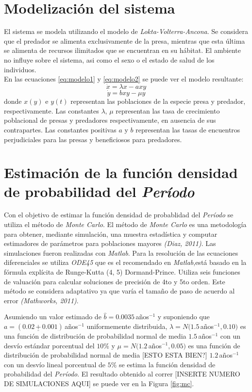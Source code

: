 \documentclass{SPANISH_acm_proc_article-sp}
\begin{document}
\section{Modelizaci\'on del sistema}
\label{sec:modelo}
El sistema se modela utilizando el modelo de \textit{Lokta-Volterra-Ancona}. Se considera que el predador
se alimenta exclusivamente de la presa, mientras que esta \'ultima se alimenta de recursos ilimitados
que se encuentran en su h\'abitat. El ambiente no influye sobre el sistema, asi como el sexo o
el estado de salud de los individuos.\\
En las ecuaciones \ref{eq:modelo1} y \ref{eq:modelo2} se puede ver el modelo resultante:
\begin{equation}
\label{eq:modelo1}
\dot{x} = \lambda x - axy
\end{equation}
\begin{equation}
\label{eq:modelo2}
\dot{y} = bxy - \mu y
\end{equation}
donde $x(y)$ e $y(t)$ representan las poblaciones de la especie presa y predador, 
respectivamente. Las constantes $\lambda$, $\mu$ representan las tasa de crecimiento
poblacional de presas y predadores respectivamente, en ausencia de sus contrapartes.
Las constantes positivas $a$ y $b$ representan las tasas de encuentros perjudiciales para 
las presas y beneficiosos para predadores.\\


\section{Estimaci\'on de la funci\'on densidad de probabilidad del \emph{Per\'iodo}}
\label{sec:estimacion}
Con el objetivo de estimar la funci\'on densidad de probablidad del \emph{Per\'iodo}
se utiliza el m\'etodo de \textit{Monte Carlo}. El m\'etodo de \textit{Monte Carlo} es una metodolog\'ia
para obtener, mediante simulaci\'on, una muestra estad\'istica y computar estimadores
de par\'ametros para poblaciones mayores \textit{(Diaz, 2011)}. Las simulaciones fueron
realizadas con \textit{Matlab}. Para la resoluci\'on de las ecuaciones diferenciales se
 utiliza \textit{ODE45} que es el recomendado en
\textit{Matlab},est\'a basado en la f\'ormula expl\'icita de Runge-Kutta (4, 5) Dormand-Prince. Utiliza seis
funciones de valuaci\'on para calcular soluciones de precisi\'on de 4to y 5to orden. Este m\'etodo se considera
adaptativo ya que var\'ia el tama\~no de paso de acuerdo al error \textit{(Mathworks, 2011)}.

Asumiendo un valor estimado de $ \hat b = 0.0035 \, $a\~nos$^{-1} $ y suponiendo que
$ a = (0.02 \, \underline{+} \, 0.001) \, $a\~nos$^{-1}$ uniformemente distribuida,
$ \lambda = N(1.5 \, $a\~nos$^{-1}, 0.10) $ es una funci\'on de distribuci\'on de probabilidad normal de media
$ 1.5 \, $a\~nos$^{-1} $ con un desv\'io est\'andar porcentual del $ 10\% $ y
$ \mu = N(1.2 \, $a\~nos$^{-1}, 0.05) $ es una funci\'on de distribuci\'on de probabilidad normal de media [ESTO ESTA BIEN?]
$ 1.2 \, $a\~nos$^{-1} $ con un desv\'io lineal porcentual de $ 5\% $ se estima
la funci\'on densidad de probabilidad del \emph{Per\'iodo}. El resultado obtenido al correr
[INSERTE NUMERO DE SIMULACIONES AQUI] se puede ver en la Figura \ref{fig:mc}.
\end{document}
